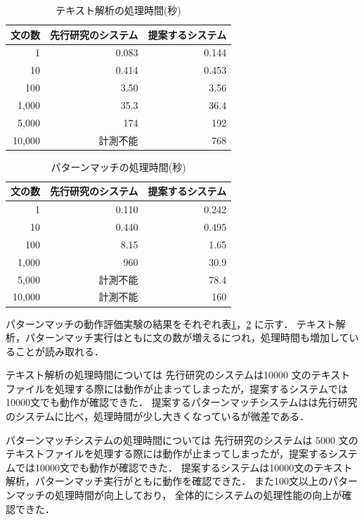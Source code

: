 \documentclass{FITpaper}
\begin{document}
\begin{table}[htbp]
  \centering
    \caption{テキスト解析の処理時間(秒)}
    \label{tbl:convert_time}
    \begin{tabular}{|r||r|r|}  
      \hline
      文の数 &先行研究のシステム& 提案するシステム \\\hline \hline
      1 & 0.083&0.144\\\hline
      10 & 0.414&0.453 \\\hline
      100 & 3.50 &3.56\\ \hline
      1,000 & 35.3&36.4 \\\hline
      5,000 &  174&192\\\hline
      10,000 &  計測不能&768\\ \hline
    \end{tabular}
  \end{table}
\begin{table}[htbp]
  \centering
    \caption{パターンマッチの処理時間(秒)}
    \label{tbl:matching_time}
    \begin{tabular}{|r||r|r|}  
      \hline
      文の数 & 先行研究のシステム& 提案するシステム\\ \hline \hline
      1 & 0.110&0.242\\\hline
      10 & 0.440 &0.495\\\hline
      100 & 8.15&1.65\\ \hline
      1,000 & 960 &30.9 \\\hline
      5,000 & 計測不能 &78.4\\\hline
      10,000 & 計測不能 &160\\ \hline
    \end{tabular}
  \end{table}


  パターンマッチの動作評価実験の結果をそれぞれ表\ref{tbl:convert_time}，\ref{tbl:matching_time} に示す．
  テキスト解析，パターンマッチ実行はともに文の数が増えるにつれ，処理時間も増加していることが読み取れる．

  
  テキスト解析の処理時間については
  先行研究のシステムは10000 文のテキストファイルを処理する際には動作が止まってしまったが，提案するシステムでは10000文でも動作が確認できた．
  提案するパターンマッチシステムはは先行研究のシステムに比べ，処理時間が少し大きくなっているが微差である．
 
  パターンマッチシステムの処理時間については
  先行研究のシステムは
  5000 文のテキストファイルを処理する際には動作が止まってしまったが，提案するシステムでは10000文でも動作が確認できた．
  提案するシステムは10000文のテキスト解析，パターンマッチ実行がともに動作を確認できた．
  また100文以上のパターンマッチの処理時間が向上しており，
  全体的にシステムの処理性能の向上が確認できた．
  
\end{document}
